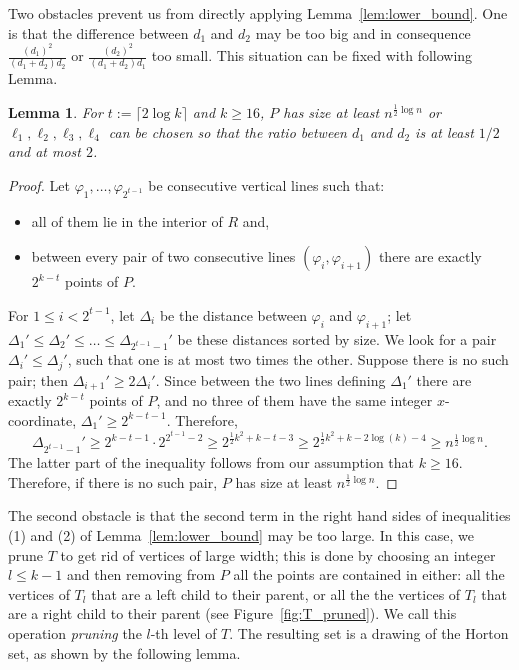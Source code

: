 \documentclass{article}
\newtheorem{lemma}[theorem]{Lemma}
\begin{document}
Two obstacles prevent us from directly applying Lemma~\ref{lem:lower_bound}. One is that the difference
between $d_1$ and $d_2$  may be too big and in consequence $\frac{(d_1)^2}{(d_1+d_2)d_2}$
or $\frac{(d_2)^2}{(d_1+d_2)d_1}$ too small. This situation can be fixed with following Lemma.

\begin{lemma}\label{lem:ratio}
 For $t:=\lceil 2\log k\rceil$ and  $k\ge 16$, $P$ has size at least $n^{\frac{1}{2} \log n}$ or $\ell_1, \ell_2, \ell_3, \ell_4$ can 
 be chosen so that the ratio between $d_1$ and $d_2$ is at least $1/2$
 and at most $2$.
\end{lemma}
\begin{proof}
Let $\varphi_1, \dots, \varphi_{2^{t-1}}$ be consecutive vertical lines such that:

\begin{itemize}
\item all of them lie in the interior of $R$ and,

\item between every pair of two consecutive lines $(\varphi_i, \varphi_{i+1})$ there are exactly $2^{k-t}$ points of $P$.
\end{itemize}

For $1 \le i < 2^{t-1}$, let $\Delta_i$ be the distance between $\varphi_i$ and  $\varphi_{i+1}$;
let $\Delta_1' \le \Delta_2'\le \dots \le  \Delta_{2^{t-1}-1}'$ be these distances sorted by size. 
We look for a pair $\Delta_i' \le \Delta_j'$, such that one is at most two times the other.
Suppose there is no such pair; then $\Delta_{i+1}'\ge 2\Delta_i'$. Since between the two lines
defining $\Delta_1'$ there are exactly $2^{k-t}$ points of $P$, and no three
of them have the same integer $x$-coordinate, $\Delta_1' \ge 2^{k-t-1}$.
Therefore,
\[\Delta_{2^{t-1}-1}'\ge  2^{k-t-1}\cdot 2^{2^{t-1}-2}\ge 2^{\frac{1}{2}k^2+k-t-3} \ge 2^{\frac{1}{2}k^2+k-2\log(k)-4} \ge n^{\frac{1}{2}\log n}. \]
The latter part of the inequality follows from our assumption that $k \ge 16$. 
Therefore, if there is no such pair, $P$ has size at least  $n^{\frac{1}{2} \log n}$.
 
\end{proof}




The second obstacle
is that the second term in the right hand sides of inequalities (1) and (2)
of Lemma~\ref{lem:lower_bound} may be too large. In this case, we  prune
$T$ to get rid of vertices of large width; this is done by choosing 
an integer $l \le k-1$ and then removing from
$P$ all the points are contained in either: all the vertices
of $T_l$ that are a left child to their parent, or all the 
the vertices of $T_l$ that are a right child to their parent 
(see Figure~\ref{fig:T_pruned}). We call this operation 
\emph{pruning} the $l$-th level of $T$. The resulting set is a drawing
of the Horton set, as shown by the following lemma.
\end{document}
